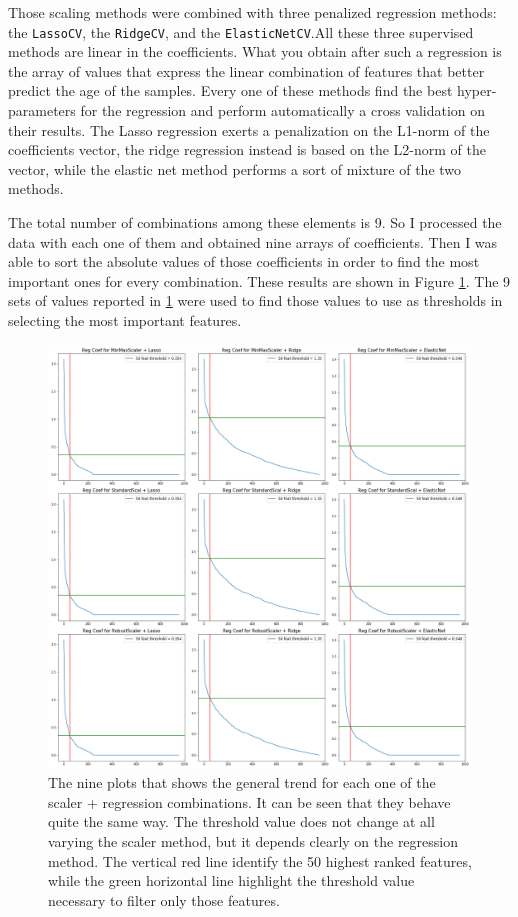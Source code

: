 \documentclass[11pt,a4paper]{report}
\begin{document}
Those scaling methods were combined with three penalized regression methods: the \texttt{LassoCV}, the \texttt{RidgeCV}, and the \texttt{ElasticNetCV}.All these three supervised methods are linear in the coefficients. What you obtain after such a regression is the array of values that express the linear combination of features that better predict the age of the samples. Every one of these methods find the best hyper-parameters for the regression and perform automatically a cross validation on their results.  The Lasso regression exerts a penalization on the L1-norm of the coefficients vector, the ridge regression instead is based on the L2-norm of the vector, while the elastic net method performs a sort of mixture of the two methods.

The total number of combinations among these elements is 9. So I processed the data with each one of them and obtained nine arrays of coefficients. Then I was able to sort the absolute values of those coefficients in order to find the most important ones for every combination. These results are shown in Figure \ref{fig:NineCoefPlot}. The 9 sets of values reported in \ref{fig:NineCoefPlot} were used to find those values to use as thresholds in selecting the most important features.

\begin{figure}[H]
  \begin{center}
  \includegraphics[width=0.9\linewidth]{NineCoefPlot.png}
  \caption{\small{The nine plots that shows the general trend for each one of the scaler + regression combinations. It can be seen that they behave quite the same way. The threshold value does not change at all varying the scaler method, but it depends clearly on the regression method. The vertical red line identify the 50 highest ranked features, while the green horizontal line highlight the threshold value necessary to filter only those features.}}
  \label{fig:NineCoefPlot}
  \end{center}
\end{figure}
\end{document}
